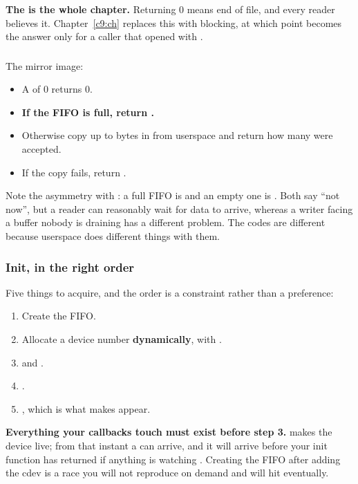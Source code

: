\textbf{The  is the whole chapter.} Returning 0 means end of file, and every reader
believes it. Chapter~\ref{c9:ch} replaces this with blocking, at which point  becomes
the answer only for a caller that opened with .

\subsubsection{}
\label{c5:app:b:write}

The mirror image:
\begin{itemize}
  \item A  of 0 returns 0.
  \item \textbf{If the FIFO is full, return .}
  \item Otherwise copy up to  bytes in from userspace and return how many were accepted.
  \item If the copy fails, return .
\end{itemize}
Note the asymmetry with : a full FIFO is  and an empty one is
. Both say ``not now'', but a reader can reasonably wait for data to arrive, whereas a
writer facing a buffer nobody is draining has a different problem. The codes are different because
userspace does different things with them.

\subsubsection{Init, in the right order}
\label{c5:app:b:init-in-the-right-order}

Five things to acquire, and the order is a constraint rather than a preference:
\begin{enumerate}
  \item Create the FIFO.
  \item Allocate a device number \textbf{dynamically}, with .
  \item {} and .
  \item {}.
  \item {}, which is what makes  appear.
\end{enumerate}
\textbf{Everything your callbacks touch must exist before step 3.}  makes the device
live; from that instant a  can arrive, and it will arrive before your init function has
returned if anything is watching . Creating the FIFO after adding the cdev is a race you
will not reproduce on demand and will hit eventually.

